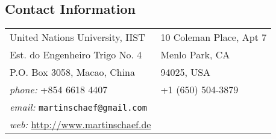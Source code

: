\documentclass[margin,line]{res}
\begin{document}

\begin{resume}
\section{\sc Contact Information}
\iffalse
United Nations University, IIST \\               
Est. do Engenheiro Trigo No. 4 \\
P.O. Box 3058, Macao, China \\
\emph{phone:}  +854 6618 4407 \\
\emph{email:}  \texttt{martinschaef@gmail.com}\\
\emph{web:} \url{http://www.martinschaef.de}
\fi

\begin{tabular}{@{}p{3in}p{4in}}
United Nations University, IIST  & 10 Coleman Place, Apt 7\\               
Est. do Engenheiro Trigo No. 4  & Menlo Park, CA\\
P.O. Box 3058, Macao, China  & 94025, USA\\
\emph{phone:}  +854 6618 4407 & +1 (650) 504-3879\\
\emph{email:}  \texttt{martinschaef@gmail.com} & \\
\emph{web:} \url{http://www.martinschaef.de} & \\
\end{tabular}





\end{resume}
\end{document}
